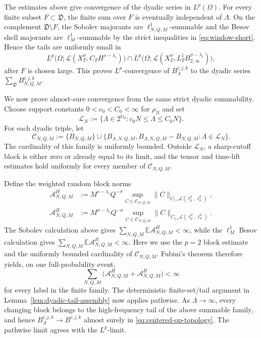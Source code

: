 \documentclass[11pt,reqno]{amsart}
\numberwithin{equation}{section}
\theoremstyle{plain}
\theoremstyle{definition}
\newcommand{\N}{\mathbb N}
\newcommand{\E}{\mathbb E}
\newcommand{\cL}{\mathcal L}
\begin{document}
The estimates above give convergence of the dyadic series in \(L^p(\Omega)\).  For every finite subset \(F\subset\mathfrak D\), the finite sum over \(F\) is eventually independent of \(\Lambda\).  On the complement \(\mathfrak D\setminus F\), the Sobolev majorants are \(\ell^1_{N,Q,M}\)-summable and the Besov shell majorants are \(\ell^1_M\)-summable by the strict inequalities in \eqref{eq:window-short}.  Hence the tails are uniformly small in
\[
        L^p\bigl(\Omega;\cL(X_T^\sigma,C_TH^{s-\lambda_i})\bigr)
        \cap
        L^p\bigl(\Omega;\cL(X_T^\sigma,L_T^1B^{\sigma-\lambda_i}_{2,\infty})\bigr),
\]
after \(F\) is chosen large.  This proves \(L^p\)-convergence of \(B_\Lambda^{i;j,k}\) to the dyadic series \(\sum_{\mathfrak D}B_{N,Q,M}^{i;j,k}\).

We now prove almost-sure convergence from the same strict dyadic
summability.  Choose support constants \(0<c_0<C_0<\infty\) for \(\rho_N\)
and set
\[
        \mathscr L_N
        :=\{\Lambda\in2^{\N_0}:c_0N\le\Lambda\le C_0N\}.
\]
For each dyadic triple, let
\[
\mathscr C_{N,Q,M}:=
\{B_{N,Q,M}\}
\cup
\{B_{\Lambda,N,Q,M},
  B_{\Lambda,N,Q,M}-B_{N,Q,M}:\Lambda\in\mathscr L_N\}.
\]
The cardinality of this family is uniformly bounded.  Outside
\(\mathscr L_N\), a sharp-cutoff block is either zero or already equal to its
limit, and the tensor and time-lift estimates hold uniformly for every
member of \(\mathscr C_{N,Q,M}\).

Define the weighted random block norms
\[
\begin{aligned}
\mathcal A^H_{N,Q,M}
&:=M^{s-\lambda_i}Q^{-\sigma}
  \sup_{C\in\mathscr C_{N,Q,M}}
  \|C\|_{C_{t,s}\cL(\ell_q^2,\ell_n^2)},\\
\mathcal A^B_{N,Q,M}
&:=M^{\sigma-\lambda_i}Q^{-\sigma}
  \sup_{C\in\mathscr C_{N,Q,M}}
  \|C\|_{C_{t,s}\cL(\ell_q^2,\ell_n^2)}.
\end{aligned}
\]
The Sobolev calculation above gives
\(\sum_{N,Q,M}\E\mathcal A^H_{N,Q,M}<\infty\), while the
\(\ell^1_M\) Besov calculation gives
\(\sum_{N,Q,M}\E\mathcal A^B_{N,Q,M}<\infty\).  Here we use the
\(p=2\) block estimate and the uniformly bounded cardinality of
\(\mathscr C_{N,Q,M}\).  Fubini's theorem therefore yields, on one
full-probability event,
\[
        \sum_{N,Q,M}
        \bigl(\mathcal A^H_{N,Q,M}+\mathcal A^B_{N,Q,M}\bigr)<\infty
\]
for every label in the finite family.  The deterministic finite-set/tail
argument in Lemma~\ref{lem:dyadic-tail-assembly} now applies pathwise.  As
\(\Lambda\to\infty\), every changing block belongs to the high-frequency
tail of the above summable family, and hence
\(B_\Lambda^{i;j,k}\to B^{i;j,k}\) almost surely in
\eqref{eq:centered-op-topology}.  The pathwise limit agrees with the
\(L^p\)-limit.
\end{document}
